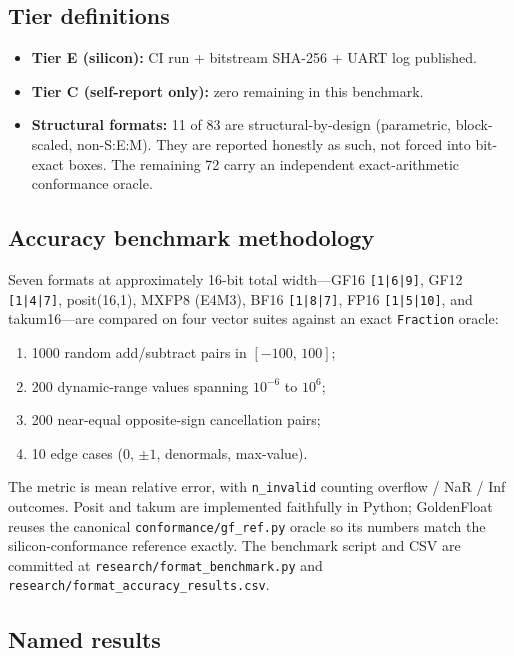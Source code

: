 \documentclass[11pt]{article}
\begin{document}
\subsection{Tier definitions}

\begin{itemize}[leftmargin=*]
\item \textbf{Tier E (silicon):} CI run + bitstream SHA-256 + UART log
  published.
\item \textbf{Tier C (self-report only):} zero remaining in this benchmark.
\item \textbf{Structural formats:} 11 of 83 are structural-by-design
  (parametric, block-scaled, non-S:E:M). They are reported honestly as such,
  not forced into bit-exact boxes. The remaining 72 carry an independent
  exact-arithmetic conformance oracle.
\end{itemize}

\subsection{Accuracy benchmark methodology}

Seven formats at approximately 16-bit total width---GF16 \texttt{[1|6|9]}, GF12
\texttt{[1|4|7]}, posit(16,1), MXFP8 (E4M3), BF16 \texttt{[1|8|7]}, FP16
\texttt{[1|5|10]}, and takum16---are compared on four vector suites against an
exact \texttt{Fraction} oracle:
\begin{enumerate}[label=(\roman*),leftmargin=*]
\item 1000 random add/subtract pairs in $[-100,\,100]$;
\item 200 dynamic-range values spanning $10^{-6}$ to $10^{6}$;
\item 200 near-equal opposite-sign cancellation pairs;
\item 10 edge cases (0, $\pm 1$, denormals, max-value).
\end{enumerate}
The metric is mean relative error, with \texttt{n\_invalid} counting overflow /
NaR / Inf outcomes. Posit and takum are implemented faithfully in Python;
GoldenFloat reuses the canonical \texttt{conformance/gf\_ref.py} oracle so its
numbers match the silicon-conformance reference exactly. The benchmark script
and CSV are committed at \texttt{research/format\_benchmark.py} and
\texttt{research/format\_accuracy\_results.csv}.

\subsection{Named results}\label{sec:named}
\end{document}
